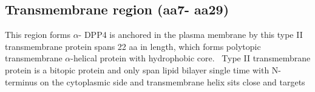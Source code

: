 \subsection{Transmembrane region (aa7- aa29)}

This region forms $\alpha$-
DPP4 is anchored in the plasma membrane by this type II transmembrane protein spans 22 aa in length, which forms polytopic transmembrane $\alpha$-helical protein with hydrophobic core.~\cite{Hong_1990} Type II transmembrane protein is a bitopic protein and only span lipid bilayer single time with N-terminus on the cytoplasmic side and transmembrane helix sits close and targets 


